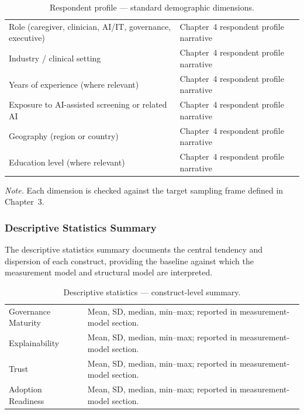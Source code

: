 {\tablestripes\tablefontsize
{}
\begin{xltabular}{\textwidth}{@{} >{\raggedright\arraybackslash}p{5cm} L @{}}
\caption[Respondent profile --- standard demographic dimensions]{Respondent profile --- standard demographic dimensions.}\label{tab:ch4_respondent_profile} \\
\toprule
{} &  \\
\midrule
\endfirsthead
\endhead
\bottomrule
\endlastfoot
Role (caregiver, clinician, AI/IT, governance, executive) & Chapter~4 respondent profile narrative \\
\addlinespace
Industry / clinical setting & Chapter~4 respondent profile narrative \\
\addlinespace
Years of experience (where relevant) & Chapter~4 respondent profile narrative \\
\addlinespace
Exposure to AI-assisted screening or related AI & Chapter~4 respondent profile narrative \\
\addlinespace
Geography (region or country) & Chapter~4 respondent profile narrative \\
\addlinespace
Education level (where relevant) & Chapter~4 respondent profile narrative \\
\end{xltabular}}

\vspace{0.3em}\noindent\textit{Note.} Each dimension is checked against the target sampling frame defined in Chapter~3.


\subsubsection{Descriptive Statistics Summary}
\label{sec:ch4_descriptive_summary}

\noindent The descriptive statistics summary documents the central tendency and dispersion of each construct, providing the baseline against which the measurement model and structural model are interpreted.

{\tablestripes\tablefontsize
{}
\begin{xltabular}{\textwidth}{@{} >{\raggedright\arraybackslash}p{5cm} L @{}}
\caption[Descriptive statistics --- construct-level summary]{Descriptive statistics --- construct-level summary.}\label{tab:ch4_descriptive_summary} \\
\toprule
{} &  \\
\midrule
\endfirsthead
\endhead
\bottomrule
\endlastfoot
Governance Maturity & Mean, SD, median, min--max; reported in measurement-model section. \\
\addlinespace
Explainability & Mean, SD, median, min--max; reported in measurement-model section. \\
\addlinespace
Trust & Mean, SD, median, min--max; reported in measurement-model section. \\
\addlinespace
Adoption Readiness & Mean, SD, median, min--max; reported in measurement-model section. \\
\end{xltabular}}

